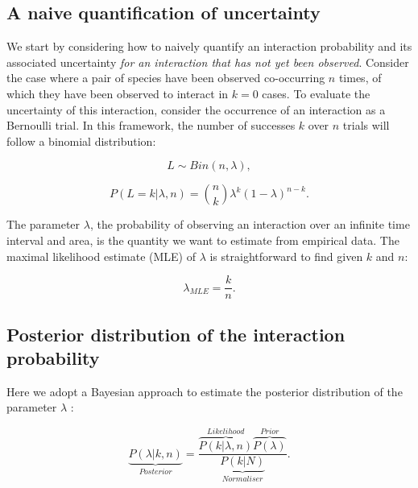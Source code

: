 \documentclass[12pt]{article}
\begin{document}
  \subsection*{A naive quantification of uncertainty}

    We start by considering how to naively quantify an interaction probability and its associated uncertainty \emph{for an interaction that has not yet been observed}. Consider the case where a pair of species have been observed co-occurring $n$ times, of which they have been observed to interact in $k = 0$ cases. To evaluate the uncertainty of this interaction, consider the occurrence of an interaction as a Bernoulli trial. In this framework, the number of successes $k$ over $n$ trials will follow a binomial distribution: 
        
        \begin{equation}
          L \sim Bin(n,\lambda) ,
        \end{equation}


        \begin{equation}
           P(L = k|\lambda,n) = {n \choose k}\lambda^k(1-\lambda)^{n-k} . 
           \label{likelihood}
        \end{equation}

    \noindent The parameter $\lambda$, the probability of observing an interaction over an infinite time interval and area, is the quantity we want to estimate from empirical data. 
    The maximal likelihood estimate (MLE) of $\lambda$ is straightforward to find given $k$ and $n$:

        \begin{equation}
          \lambda_{MLE} = \frac{k}{n}  .
          \label{theta_MLE}
        \end{equation}


  \subsection*{Posterior distribution of the interaction probability}

    Here we adopt a Bayesian approach to estimate the posterior distribution of the parameter $\lambda$ :

    \begin{equation}
      \underbrace{P(\lambda|k,n)}_{Posterior} = \frac{\overbrace{P(k|\lambda,n)}^{Likelihood}\overbrace{P(\lambda)}^{Prior}}{\underbrace{P(k|N)}_{Normaliser}} .
      \label{posterior}
    \end{equation}
\end{document}
